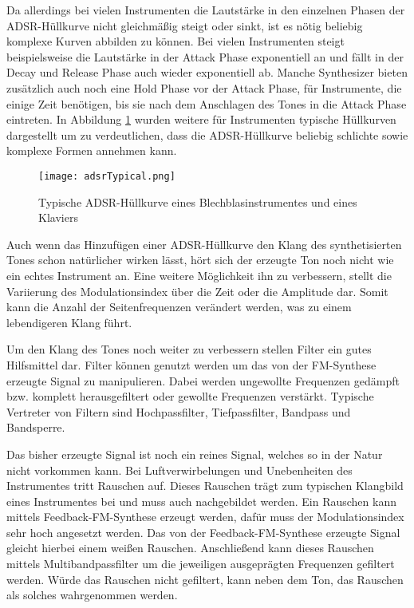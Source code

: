 Da allerdings bei vielen Instrumenten die Lautstärke in den einzelnen Phasen der ADSR-Hüllkurve nicht gleichmäßig steigt oder sinkt, ist es nötig beliebig komplexe Kurven abbilden zu können. Bei vielen Instrumenten steigt beispielsweise die Lautstärke in der Attack Phase exponentiell an und fällt in der Decay und Release Phase auch wieder exponentiell ab. Manche Synthesizer bieten zusätzlich auch noch eine Hold Phase vor der Attack Phase, für Instrumente, die einige Zeit benötigen, bis sie nach dem Anschlagen des Tones in die Attack Phase eintreten. In Abbildung \ref{fig:adsrTypical} wurden weitere für Instrumenten typische Hüllkurven dargestellt um zu verdeutlichen, dass die ADSR-Hüllkurve beliebig schlichte sowie komplexe Formen annehmen kann.

\begin{figure} [ht]
\centering
  \texttt{[image: adsrTypical.png]}
\caption{Typische ADSR-Hüllkurve eines Blechblasinstrumentes \cite{chowningPaper} und eines Klaviers}
\label{fig:adsrTypical} 
\end{figure}

Auch wenn das Hinzufügen einer ADSR-Hüllkurve den Klang des synthetisierten Tones schon natürlicher wirken lässt, hört sich der erzeugte Ton noch nicht wie ein echtes Instrument an. Eine weitere Möglichkeit ihn zu verbessern, stellt die Variierung des Modulationsindex über die Zeit oder die Amplitude dar. Somit kann die Anzahl der Seitenfrequenzen verändert werden, was zu einem lebendigeren Klang führt. \cite[S. 532]{chowningPaper}

Um den Klang des Tones noch weiter zu verbessern stellen Filter ein gutes Hilfsmittel dar. Filter können genutzt werden um das von der FM-Synthese erzeugte Signal zu manipulieren. Dabei werden ungewollte Frequenzen gedämpft bzw. komplett herausgefiltert oder gewollte Frequenzen verstärkt. Typische Vertreter von Filtern sind Hochpassfilter, Tiefpassfilter, Bandpass und Bandsperre. \cite[S. 100-104]{stotz}

Das bisher erzeugte Signal ist noch ein reines Signal, welches so in der Natur nicht vorkommen kann. Bei Luftverwirbelungen und Unebenheiten des Instrumentes tritt Rauschen auf. Dieses Rauschen trägt zum typischen Klangbild eines Instrumentes bei und muss auch nachgebildet werden. Ein Rauschen kann mittels Feedback-FM-Synthese erzeugt werden, dafür muss der Modulationsindex sehr hoch angesetzt werden. Das von der Feedback-FM-Synthese erzeugte Signal gleicht hierbei einem weißen Rauschen. Anschließend kann dieses Rauschen mittels Multibandpassfilter um die jeweiligen ausgeprägten Frequenzen gefiltert werden. Würde das Rauschen nicht gefiltert, kann neben dem Ton, das Rauschen als solches wahrgenommen werden. \cite[S. 152]{barkowsky}

